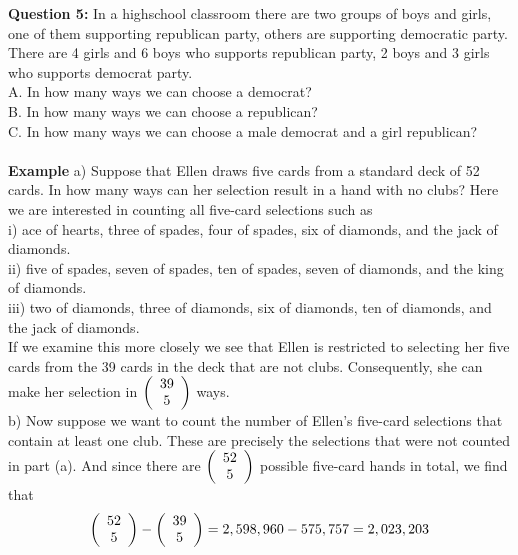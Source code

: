 \documentclass[11pt]{article}
\begin{document}
\textbf{Question 5:} In a highschool classroom there are two groups of boys and girls, one of 
them supporting republican party, others are supporting democratic party. There are 4 girls 
and 6 boys who supports republican party, 2 boys and 3 girls who supports democrat 
party.\\ %
A. In how many ways we can choose a democrat?\\
B. In how many ways we can choose a republican?\\
C. In how many ways we can choose a male democrat and a girl republican?\\
\\

\textbf{Example} a) Suppose that Ellen draws five cards from a standard deck of 52 cards. 
In how many ways can her selection result in a hand with no clubs? Here we are 
interested in counting all five-card selections such as\\
i) ace of hearts, three of spades, four of spades, six of diamonds, and the jack of 
diamonds.\\
ii) five of spades, seven of spades, ten of spades, seven of diamonds, and the king of 
diamonds.\\
iii) two of diamonds, three of diamonds, six of diamonds, ten of diamonds, and the jack of 
diamonds.\\
If we examine this more closely we see that Ellen is restricted to selecting her five cards 
from the 39 cards in the deck that are not clubs. Consequently, she can make her 
selection in 
$\left( {\begin{array}{*{20}c}  39  \\  5  \\ \end{array}} \right)$ 
ways.\\
b) Now suppose we want to count the number of Ellen's five-card selections that contain 
at least one club. These are precisely the selections that were not counted in part (a). And 
since there are
$\left( {\begin{array}{*{20}c} 52  \\ 5  \\ \end{array}} \right)$ 
possible five-card hands in total, we find that 
$$ \left( {\begin{array}{*{20}c} 52  \\ 5  \\ \end{array}} \right) - \left( {\begin{array}{*{20}c} 39  \\ 5  \\ \end{array}} \right) = 2,598,960 - 575,757 = 2,023,203  $$
\end{document}
